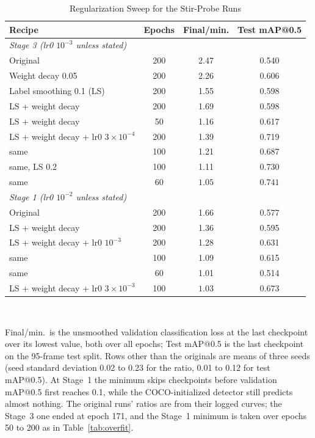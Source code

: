 ﻿\documentclass[journal]{IEEEtran}
\begin{document}
\begin{table}[!t]
\renewcommand{\arraystretch}{1.3}
\caption{Regularization Sweep for the Stir-Probe Runs}
\label{tab:stirreg}
\centering
\footnotesize
\setlength{\tabcolsep}{3.5pt}
\begin{tabular}{l c c c}
\toprule
\textbf{Recipe} & \textbf{Epochs} & \textbf{Final/min.} & \textbf{Test mAP@0.5} \\
\midrule
\multicolumn{4}{l}{\emph{Stage 3 (lr0 $10^{-3}$ unless stated)}} \\
Original & 200 & 2.47 & 0.540 \\
Weight decay 0.05 & 200 & 2.26 & 0.606 \\
Label smoothing 0.1 (LS) & 200 & 1.55 & 0.598 \\
LS + weight decay & 200 & 1.69 & 0.598 \\
LS + weight decay & 50 & 1.16 & 0.617 \\
LS + weight decay + lr0 $3 \times 10^{-4}$ & 200 & 1.39 & 0.719 \\
\quad same & 100 & 1.21 & 0.687 \\
\quad same, LS 0.2 & 100 & 1.11 & 0.730 \\
\quad same & 60 & $\mathbf{1.05}$ & $\mathbf{0.741}$ \\
\midrule
\multicolumn{4}{l}{\emph{Stage 1 (lr0 $10^{-2}$ unless stated)}} \\
Original & 200 & 1.66 & 0.577 \\
LS + weight decay & 200 & 1.36 & 0.595 \\
LS + weight decay + lr0 $10^{-3}$ & 200 & 1.28 & 0.631 \\
\quad same & 100 & 1.09 & 0.615 \\
\quad same & 60 & 1.01 & 0.514 \\
LS + weight decay + lr0 $3 \times 10^{-3}$ & 100 & $\mathbf{1.03}$ & $\mathbf{0.673}$ \\
\bottomrule
\end{tabular}
\\[2pt]
\parbox{\columnwidth}{\footnotesize Final/min.\ is the unsmoothed validation classification loss at the last checkpoint over its lowest value, both over all epochs; Test mAP@0.5 is the last checkpoint on the 95-frame test split. Rows other than the originals are means of three seeds (seed standard deviation 0.02 to 0.23 for the ratio, 0.01 to 0.12 for test mAP@0.5). At Stage~1 the minimum skips checkpoints before validation mAP@0.5 first reaches 0.1, while the COCO-initialized detector still predicts almost nothing. The original runs' ratios are from their logged curves; the Stage~3 one ended at epoch 171, and the Stage~1 minimum is taken over epochs 50 to 200 as in Table~\ref{tab:overfit}.}
\end{table}
\end{document}
